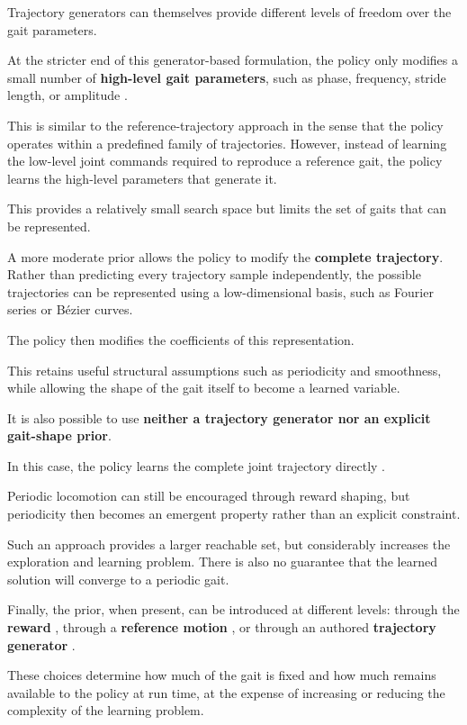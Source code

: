Trajectory generators can themselves provide different levels of freedom over the gait parameters.

At the stricter end of this generator-based formulation, the policy only modifies a small number of \textbf{high-level gait parameters}, such as phase, frequency, stride length, or amplitude \cite{cpgrl2022}.

This is similar to the reference-trajectory approach in the sense that the policy operates within a predefined family of trajectories. However, instead of learning the low-level joint commands required to reproduce a reference gait, the policy learns the high-level parameters that generate it.

This provides a relatively small search space but limits the set of gaits that can be represented.

A more moderate prior allows the policy to modify the \textbf{complete trajectory}. Rather than predicting every trajectory sample independently, the possible trajectories can be represented using a low-dimensional basis, such as Fourier series \cite{shafii2010tfs} or Bézier curves.

The policy then modifies the coefficients of this representation.

This retains useful structural assumptions such as periodicity and smoothness, while allowing the shape of the gait itself to become a learned variable.

It is also possible to use \textbf{neither a trajectory generator nor an explicit gait-shape prior}.

In this case, the policy learns the complete joint trajectory directly \cite{heess2017emergence}.

Periodic locomotion can still be encouraged through reward shaping, but periodicity then becomes an emergent property rather than an explicit constraint.

Such an approach provides a larger reachable set, but considerably increases the exploration and learning problem. There is also no guarantee that the learned solution will converge to a periodic gait.

Finally, the prior, when present, can be introduced at different levels: through the \textbf{reward} \cite{siekmann2021}, through a \textbf{reference motion} \cite{peng2018deepmimic}, or through an authored \textbf{trajectory generator} \cite{pmtg2018,cpgrl2022}.

These choices determine how much of the gait is fixed and how much remains available to the policy at run time, at the expense of increasing or reducing the complexity of the learning problem.

